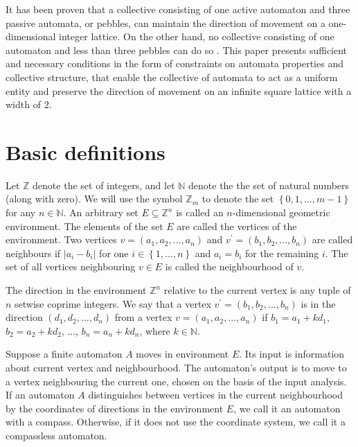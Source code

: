 \documentclass{article}
\begin{document}
It has been proven that a collective consisting of one active automaton and three passive automata, or pebbles, can maintain the direction of movement on a one-dimensional integer lattice. 
On the other hand, no collective consisting of one automaton and less than three pebbles can do so \cite{Kurganskyy2016}.
This paper presents sufficient and necessary conditions in the form of constraints on automata properties and collective structure, that enable the collective of automata to act as a uniform entity and preserve the direction of movement on an infinite square lattice with a width of $2$.

\section{Basic definitions}

Let $\mathbb{Z}$ denote the set of integers, and let $\mathbb{N}$ denote the the set of natural numbers (along with zero).
We will use the symbol $\mathbb{Z}_{m}$ to denote the set $\left\{ 0, 1, ..., m - 1 \right\}$ for any $n \in \mathbb{N}$.
An arbitrary set $E \subseteq \mathbb{Z}^{n}$ is called an $n$-dimensional geometric environment.
The elements of the set $E$ are called the vertices of the environment.
Two vertices $v = \left( a_{1}, a_{2}, ..., a_{n} \right)$ and $v^{\prime} = \left( b_{1}, b_{2}, ..., b_{n} \right)$ are called neighbours if $\vert a_{i} - b_{i} \vert$ for one $i \in \left\{ 1, ..., n \right\}$ and $a_{i} = b_{i}$ for the remaining $i$.
The set of all vertices neighbouring $v \in E$ is called the neighbourhood of $v$.

The direction in the environment $\mathbb{Z}^{n}$ relative to the current vertex is any tuple of $n$ setwise coprime integers.
We say that a vertex $v^{\prime} = \left( b_{1}, b_{2}, ..., b_{n} \right)$ is in the direction $\left( d_{1}, d_{2}, ..., d_{n} \right)$ from a vertex $v = \left( a_{1}, a_{2}, ..., a_{n} \right)$ if $b_{1} = a_{1} + kd_{1}$, $b_{2} = a_{2} + kd_{2}$, ..., $b_{n} = a_{n} + kd_{n}$,
where $k \in \mathbb{N}$.

Suppose a finite automaton $A$ moves in environment $E$. 
Its input is information about current vertex and neighbourhood. 
The automaton's output is to move to a vertex neighbouring the current one, chosen on the basis of the input analysis.
If an automaton $A$ distinguishes between vertices in the current neighbourhood by the coordinates of directions in the environment $E$, we call it an automaton with a compass. 
Otherwise, if it does not use the coordinate system, we call it a compassless automaton.
\end{document}
